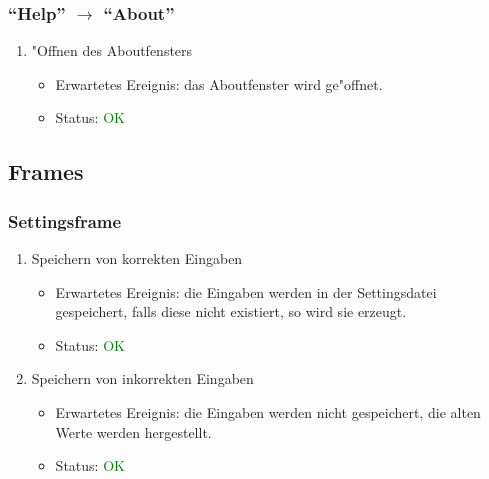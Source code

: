 \subsubsection{"`Help"' $\rightarrow$ "`About"'}
\begin{enumerate}
\item "Offnen des Aboutfensters
\begin{itemize}
\item Erwartetes Ereignis: das Aboutfenster wird ge"offnet. 
\item Status: \textcolor{green}{OK}
\end{itemize}
\end{enumerate}

\subsection{Frames}
\subsubsection{Settingsframe}
\begin{enumerate}
\item Speichern von korrekten Eingaben
\begin{itemize}
\item Erwartetes Ereignis: die Eingaben werden in der Settingsdatei gespeichert, falls diese nicht existiert, so wird sie erzeugt.
\item Status: \textcolor{green}{OK}
\end{itemize}
\item Speichern von inkorrekten Eingaben
\begin{itemize}
\item Erwartetes Ereignis: die Eingaben werden nicht gespeichert, die alten Werte werden hergestellt.  
\item Status: \textcolor{green}{OK}
\end{itemize}
\end{enumerate}
